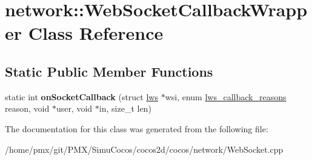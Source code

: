 \hypertarget{classnetwork_1_1WebSocketCallbackWrapper}{}\section{network\+:\+:Web\+Socket\+Callback\+Wrapper Class Reference}
\label{classnetwork_1_1WebSocketCallbackWrapper}
\subsection*{Static Public Member Functions}
\begin{DoxyCompactItemize}
\item 
\mbox{\label{classnetwork_1_1WebSocketCallbackWrapper_a3900154063a03767f4895984b819ff74}} 
static int {\bfseries on\+Socket\+Callback} (struct \hyperlink{structlws}{lws} $\ast$wsi, enum \hyperlink{group__usercb_gad62860e19975ba4c4af401c3cdb6abf7}{lws\+\_\+callback\+\_\+reasons} reason, void $\ast$user, void $\ast$in, size\+\_\+t len)
\end{DoxyCompactItemize}


The documentation for this class was generated from the following file\+:\begin{DoxyCompactItemize}
\item 
/home/pmx/git/\+P\+M\+X/\+Simu\+Cocos/cocos2d/cocos/network/Web\+Socket.\+cpp\end{DoxyCompactItemize}
